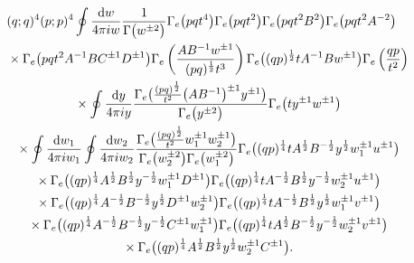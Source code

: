 \documentclass[a4paper,12pt]{article}
\begin{document}
\begin{gather*}
(q;q)^4(p;p)^4\oint\frac{{\rm d}w}{4\pi i w} \frac{1}{\Gamma\big(w^{\pm2}\big)}
\Gamma_e\big(pqt^4\big)\Gamma_e\big(pqt^2\big)\Gamma_e\big(pqt^2B^2\big)\Gamma_e\big(pqt^2A^{-2}\big)\\
\quad{} \times\Gamma_e\big(pqt^2A^{-1}BC^{\pm1}D^{\pm1}\big) \Gamma_e\left(\frac{AB^{-1}w^{\pm1}}{(pq)^{\frac{1}{2}}t^3}\right)
 \Gamma_e\big((q p)^{\frac12} tA^{-1}B w^{\pm1}\big)\Gamma_e\left(\frac{q p}{t^2}\right)\\
 \quad{}\times \oint \frac{{\rm d}y}{4\pi i y} \frac{\Gamma_e\big(\frac{(p q)^{\frac12}}{t^2}\big(A B^{-1}\big)^{\pm1}y^{\pm1}\big)}{\Gamma_e\big(y^{\pm2}\big)}\Gamma_e\big(t y^{\pm1} w^{\pm1}\big)\\
\quad{} \times\oint\frac{{\rm d}w_1}{4\pi i w_1}\oint \frac{{\rm d}w_2}{4\pi i w_2} \frac{\Gamma_e\big(\frac{(p q)^{\frac12}}{t^2}w_1^{\pm1}w_2^{\pm1}\big)}{\Gamma_e\big(w_2^{\pm2}\big)\Gamma_e\big(w_1^{\pm2}\big)} \Gamma_e\big( (q p)^{\frac14}t A^{\frac12}B^{-\frac12} y^{\frac12} w_1^{\pm1}u^{\pm1}\big)\\
\quad{} \times \Gamma_e\big((qp)^{\frac14} A^{\frac12} B^{\frac12} y^{-\frac12} w_1^{\pm1}D^{\pm1}\big)\Gamma_e\big((q p)^{\frac14} t A^{-\frac12} B^{\frac12} y^{-\frac12} w_2^{\pm1} u^{\pm1}\big) \\
\quad{} \times \Gamma_e \big((q p)^{\frac14} A^{-\frac12} B^{-\frac12} y^{\frac12} D^{\pm1}w_2^{\pm1}\big)
 \Gamma_e\big((q p)^{\frac14} t A^{-\frac12} B^\frac12 y^\frac12 w_1^{\pm1} v^{\pm1}\big)\\
\quad{} \times \Gamma_e\big( ( q p)^{\frac14} A^{-\frac12} B^{-\frac12} y^{-\frac12} C^{\pm1} w_1^{\pm1}\big) \Gamma_e\big( ( q p )^{\frac14} t A^{\frac12} B^{-\frac12} y^{-\frac12} w_2^{\pm1} v^{\pm1}\big) \\
\quad{} \times \Gamma_e\big( ( q p )^{\frac14} A^{\frac12} B^\frac12 y^\frac12 w_2^{\pm1} C^{\pm1}\big) .
\end{gather*}
\end{document}
